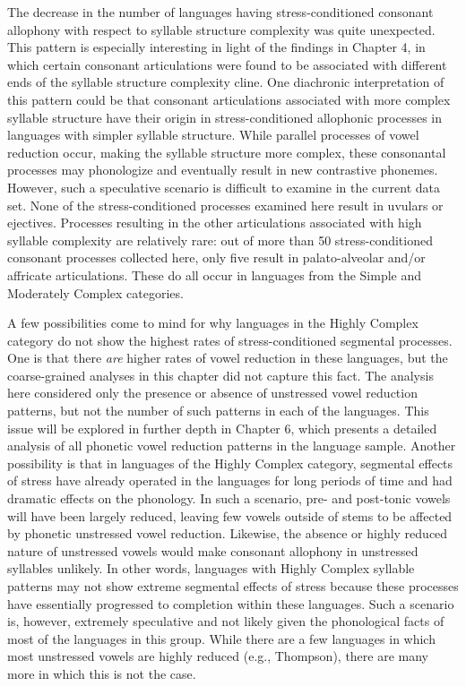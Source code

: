   The decrease in the number of languages having stress-conditioned consonant allophony with respect to syllable structure complexity was quite unexpected. This pattern is especially interesting in light of the findings in Chapter 4, in which certain consonant articulations were found to be associated with different ends of the syllable structure complexity cline. One diachronic interpretation of this pattern could be that consonant articulations associated with more complex syllable structure have their origin in stress-conditioned allophonic processes in languages with simpler syllable structure. While parallel processes of vowel reduction occur, making the syllable structure more complex, these consonantal processes may phonologize and eventually result in new contrastive phonemes. However, such a speculative scenario is difficult to examine in the current data set. None of the stress-conditioned processes examined here result in uvulars or ejectives. Processes resulting in the other articulations associated with high syllable complexity are relatively rare: out of more than 50 stress-conditioned consonant processes collected here, only five result in palato-alveolar and/or affricate articulations. These do all occur in languages from the Simple and Moderately Complex categories.

  A few possibilities come to mind for why languages in the Highly Complex category do not show the highest rates of stress-conditioned segmental processes. One is that there \textit{are} higher rates of vowel reduction in these languages, but the coarse-grained analyses in this chapter did not capture this fact. The analysis here considered only the presence or absence of unstressed vowel reduction patterns, but not the number of such patterns in each of the languages. This issue will be explored in further depth in Chapter 6, which presents a detailed analysis of all phonetic vowel reduction patterns in the language sample. Another possibility is that in languages of the Highly Complex category, segmental effects of stress have already operated in the languages for long periods of time and had dramatic effects on the phonology. In such a scenario, pre- and post-tonic vowels will have been largely reduced, leaving few vowels outside of stems to be affected by phonetic unstressed vowel reduction. Likewise, the absence or highly reduced nature of unstressed vowels would make consonant allophony in unstressed syllables unlikely. In other words, languages with Highly Complex syllable patterns may not show extreme segmental effects of stress because these processes have essentially progressed to completion within these languages. Such a scenario is, however, extremely speculative and not likely given the phonological facts of most of the languages in this group. While there are a few languages in which most unstressed vowels are highly reduced (e.g., Thompson), there are many more in which this is not the case.

